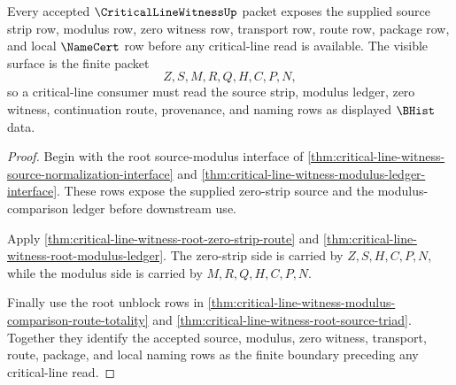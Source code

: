\begin{theorem}
\label{thm:critical-line-witness-source-modulus-exposure}
Every accepted $\CriticalLineWitnessUp$ packet exposes the supplied source strip row, modulus row, zero witness row, transport row, route row, package row, and local $\NameCert$ row before any critical-line read is available. The visible surface is the finite packet
$$
Z,S,M,R,Q,H,C,P,N,
$$
so a critical-line consumer must read the source strip, modulus ledger, zero witness, continuation route, provenance, and naming rows as displayed $\BHist$ data.
\end{theorem}
\begin{proof}
Begin with the root source-modulus interface of \autoref{thm:critical-line-witness-source-normalization-interface} and \autoref{thm:critical-line-witness-modulus-ledger-interface}. These rows expose the supplied zero-strip source and the modulus-comparison ledger before downstream use.

Apply \autoref{thm:critical-line-witness-root-zero-strip-route} and \autoref{thm:critical-line-witness-root-modulus-ledger}. The zero-strip side is carried by $Z,S,H,C,P,N$, while the modulus side is carried by $M,R,Q,H,C,P,N$.

Finally use the root unblock rows in \autoref{thm:critical-line-witness-modulus-comparison-route-totality} and \autoref{thm:critical-line-witness-root-source-triad}. Together they identify the accepted source, modulus, zero witness, transport, route, package, and local naming rows as the finite boundary preceding any critical-line read.
\end{proof}

